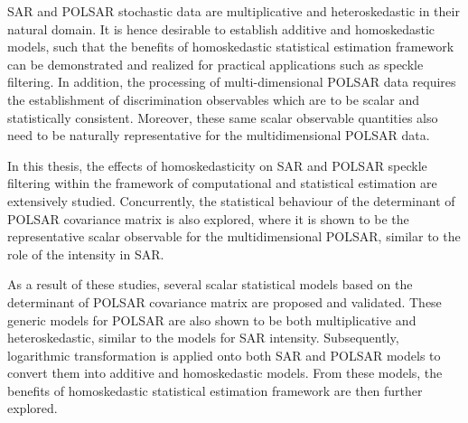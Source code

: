 

\begin{abstracts}        %

SAR and POLSAR stochastic data are multiplicative and heteroskedastic in their natural domain.
It is hence desirable to establish additive and homoskedastic models,
  such that the benefits of homoskedastic statistical estimation framework can be demonstrated and realized for practical applications such as speckle filtering.
In addition, the processing of multi-dimensional POLSAR data requires the establishment of discrimination observables
  which are to be scalar and statistically consistent.
Moreover, these same scalar observable quantities also need to be naturally representative for the multidimensional POLSAR data.

In this thesis, the effects of homoskedasticity on SAR and POLSAR speckle filtering within the framework of computational and statistical estimation are extensively studied. 
Concurrently, the statistical behaviour of the determinant of POLSAR covariance matrix is also explored,
  where it is shown to be the representative scalar observable for the multidimensional POLSAR, similar to the role of the intensity in SAR.

As a result of these studies, several scalar statistical models based on the determinant of POLSAR covariance matrix are proposed and validated.
These generic models for POLSAR are also shown to be both multiplicative and heteroskedastic, similar to the models for SAR intensity. 
Subsequently, logarithmic transformation is applied onto both SAR and POLSAR models
  to convert them into additive and homoskedastic models.
From these models, the benefits of homoskedastic statistical estimation framework are then further explored.


\end{abstracts}

